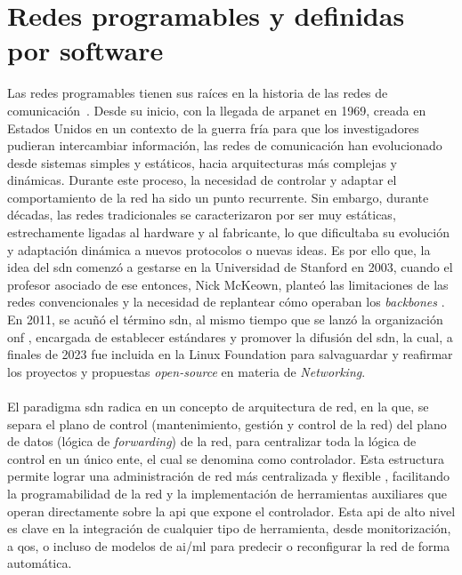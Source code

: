 \section{Redes programables y definidas por software}

Las redes programables tienen sus raíces en la historia de las redes de comunicación~\cite{meuser2024history}. Desde su inicio, con la llegada de \gls{arpanet} en 1969, creada en Estados Unidos en un contexto de la guerra fría para que los investigadores pudieran intercambiar información, las redes de comunicación han evolucionado desde sistemas simples y estáticos, hacia arquitecturas más complejas y dinámicas. Durante este proceso, la necesidad de controlar y adaptar el comportamiento de la red ha sido un punto recurrente. Sin embargo, durante décadas, las redes tradicionales se caracterizaron por ser muy estáticas, estrechamente ligadas al hardware y al fabricante, lo que dificultaba su evolución y adaptación dinámica a nuevos protocolos o nuevas ideas. Es por ello que, la idea del \gls{sdn} comenzó a gestarse en la Universidad de Stanford en 2003, cuando el profesor asociado de ese entonces, Nick McKeown, planteó las limitaciones de las redes convencionales y la necesidad de replantear cómo operaban los \textit{backbones} \cite{levy2003overhaul}. En 2011, se acuñó el término \gls{sdn}, al mismo tiempo que se lanzó la organización \gls{onf} \cite{onf}, encargada de establecer estándares y promover la difusión del \gls{sdn}, la cual, a finales de 2023 fue incluida en la Linux Foundation para salvaguardar y reafirmar los proyectos y propuestas \textit{open-source} en materia de \textit{Networking}.\\
\\
El paradigma \gls{sdn} \cite{nadeau2013sdn} radica en un concepto de arquitectura de red, en la que, se separa el plano de control (mantenimiento, gestión y control de la red) del plano de datos (lógica de \textit{forwarding}) de la red, para centralizar toda la lógica de control en un único ente, el cual se denomina como controlador. Esta estructura permite lograr una administración de red más centralizada y flexible \cite{nadeau2013sdn}, facilitando la programabilidad de la red y la implementación de herramientas auxiliares que operan directamente sobre la \gls{api} que expone el controlador. Esta \gls{api} de alto nivel es clave en la integración de cualquier tipo de herramienta, desde monitorización, a \gls{qos}, o incluso de modelos de \gls{ai}/\gls{ml} para predecir o reconfigurar la red de forma automática.\\
